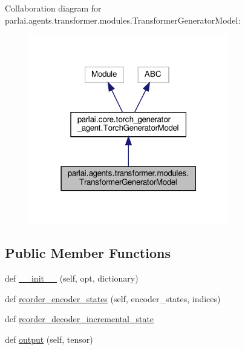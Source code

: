 Collaboration diagram for parlai.\+agents.\+transformer.\+modules.\+Transformer\+Generator\+Model\+:\nopagebreak
\begin{figure}[H]
\begin{center}
\leavevmode
\includegraphics[width=247pt]{d2/d0d/classparlai_1_1agents_1_1transformer_1_1modules_1_1TransformerGeneratorModel__coll__graph}
\end{center}
\end{figure}
\subsection*{Public Member Functions}
\begin{DoxyCompactItemize}
\item 
def \hyperlink{classparlai_1_1agents_1_1transformer_1_1modules_1_1TransformerGeneratorModel_a17276e3090a132914c0adae133e60357}{\+\_\+\+\_\+init\+\_\+\+\_\+} (self, opt, dictionary)
\item 
def \hyperlink{classparlai_1_1agents_1_1transformer_1_1modules_1_1TransformerGeneratorModel_a9b9261bca59f10692c15cbaaa3ffce65}{reorder\+\_\+encoder\+\_\+states} (self, encoder\+\_\+states, indices)
\item 
def \hyperlink{classparlai_1_1agents_1_1transformer_1_1modules_1_1TransformerGeneratorModel_a3b03690f271b1a65764e3812b2417ba2}{reorder\+\_\+decoder\+\_\+incremental\+\_\+state}
\item 
def \hyperlink{classparlai_1_1agents_1_1transformer_1_1modules_1_1TransformerGeneratorModel_ae0f0d3d038cc12075501aae3a059c997}{output} (self, tensor)
\end{DoxyCompactItemize}
